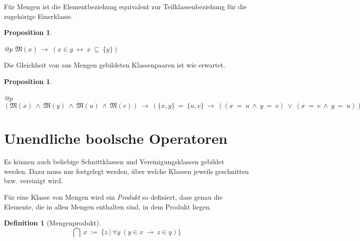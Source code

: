 \documentclass[a4paper,german,10pt,twoside]{book}
\newtheorem{prop}[thm]{Proposition}
\theoremstyle{definition}
\newtheorem{defn}[thm]{Definition}
\theoremstyle{remark}
\begin{document}
\par
F{\"u}r Mengen ist die Elementbeziehung equivalent zur Teilklassenbeziehung
f{\"u}r die zugeh{\"o}rige Einerklasse.

\begin{prop}
\label{theorem:elementEquiSingletonSubclass} \hypertarget{theorem:elementEquiSingletonSubclass}{}
\mbox{}
\begin{longtable}{{@{\extracolsep{\fill}}p{\linewidth}}}
\centering $\mathfrak{M}(x)\ \rightarrow \ (x \in y\ \leftrightarrow \ x \ \subseteq \ \{ y \})$
\end{longtable}

\end{prop}




\par
Die Gleichheit von aus Mengen gebildeten Klassenpaaren ist wie erwartet.

\begin{prop}
\label{theorem:pairIdentities} \hypertarget{theorem:pairIdentities}{}
\mbox{}
\begin{longtable}{{@{\extracolsep{\fill}}p{\linewidth}}}
\centering $(\mathfrak{M}(x)\ \land \ \mathfrak{M}(y)\ \land \ \mathfrak{M}(u)\ \land \ \mathfrak{M}(v))\ \rightarrow \ (\{ x, y \} \ =  \ \{ u, v \}\ \rightarrow \ ((x \ =  \ u\ \land \ y \ =  \ v)\ \lor \ (x \ =  \ v\ \land \ y \ =  \ u)))$
\end{longtable}

\end{prop}




\section{Unendliche boolsche Operatoren} \label{chapter3_section4} \hypertarget{chapter3_section4}{}
Es k{\"o}nnen auch beliebige Schnittklassen und Vereinigungsklassen gebildet werden. Dazu muss nur
festgelegt werden, {\"u}ber welche Klassen jeweils geschnitten bzw. vereinigt wird.

\par
F{\"u}r eine Klasse von Mengen wird ein \emph{Produkt} so definiert, dass genau die Elemente, 
die in allen Mengen enthalten sind, in dem Produkt liegen.

\begin{defn}[Mengenprodukt]
\label{setProduct} \hypertarget{setProduct}{}
$$\bigcap \ x\ := \ \{ z \ | \ \forall y\ (y \in x\ \rightarrow \ z \in y) \} $$

\end{defn}
\end{document}
